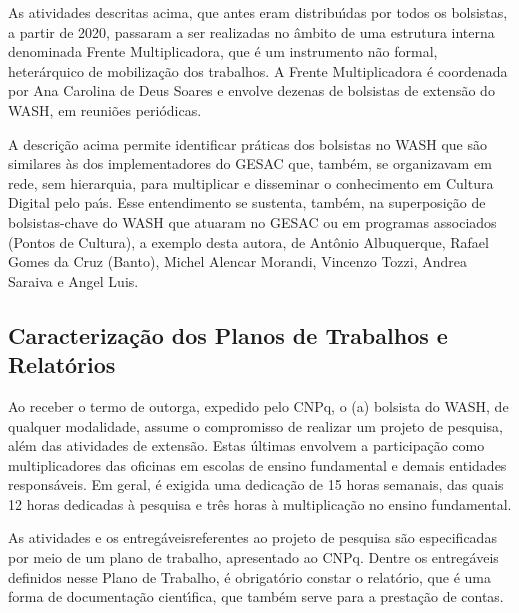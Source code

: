 \documentclass[
12pt,		%
openright,	%
twoside,  %
a4paper,			%
chapter=TITLE,		%
english,			%
french,				%
spanish,			%
brazil				%
]{USPSC-classe/USPSC}
\begin{document}
As atividades descritas acima, que antes eram distribu\'{\i}das por todos os bolsistas, a partir de 2020, passaram a ser realizadas no \^ambito de uma estrutura interna denominada \textquotedbl Frente Multiplicadora\textquotedbl , que \'e um instrumento n\~ao formal, heter\'arquico de mobiliza\c{c}\~ao dos trabalhos. A Frente Multiplicadora \'e coordenada por Ana Carolina de Deus Soares e envolve dezenas de bolsistas de extens\~ao do WASH, em reuni\~oes peri\'odicas.









A descri\c{c}\~ao acima permite identificar pr\'aticas dos bolsistas no WASH que s\~ao similares \`as dos implementadores do GESAC que, tamb\'em, se organizavam em rede, sem hierarquia, para multiplicar e disseminar o conhecimento em Cultura Digital pelo pa\'{\i}s. Esse entendimento se sustenta, tamb\'em, na superposi\c{c}\~ao de bolsistas-chave do WASH que atuaram no GESAC ou em programas associados (Pontos de Cultura), a exemplo desta autora, de Ant\^onio Albuquerque, Rafael Gomes da Cruz (Banto), Michel Alencar Morandi, Vincenzo Tozzi, Andrea Saraiva e Angel Luis.









\subsection[Caracteriza\c{c}\~ao dos Planos de Trabalhos e Relat\'orios]{Caracteriza\c{c}\~ao dos Planos de Trabalhos e Relat\'orios}\label{Caracteriza\c{c}\~ao dos Planos de Trabalhos e Relat\'orios}
Ao receber o termo de outorga, expedido pelo CNPq, o (a) bolsista do WASH, de qualquer modalidade, assume o compromisso de realizar um projeto de pesquisa, al\'em das atividades de extens\~ao. Estas \'ultimas envolvem a participa\c{c}\~ao como multiplicadores das oficinas em escolas de ensino fundamental e demais entidades respons\'aveis. Em geral, \'e exigida uma dedica\c{c}\~ao de 15 horas semanais, das quais 12 horas dedicadas \`a pesquisa e tr\^es horas \`a multiplica\c{c}\~ao no ensino fundamental.









As atividades e os \textquotedbl entreg\'aveis\textquotedbl  referentes ao projeto de pesquisa s\~ao especificadas por meio de um plano de trabalho, apresentado ao CNPq. Dentre os entreg\'aveis definidos nesse Plano de Trabalho, \'e obrigat\'orio constar o relat\'orio, que \'e uma forma de documenta\c{c}\~ao cient\'{\i}fica, que tamb\'em serve para a presta\c{c}\~ao de contas.
\end{document}
